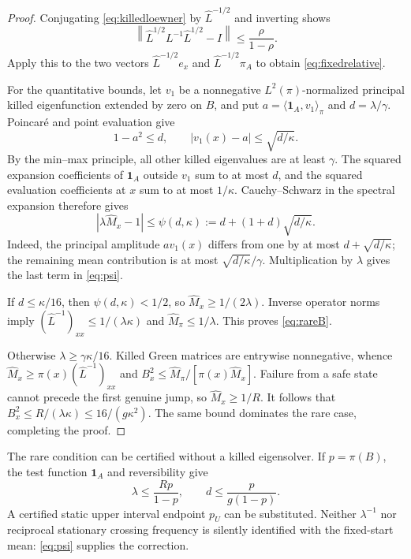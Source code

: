 \documentclass[10pt,a4paper]{article}
\theoremstyle{definition}\newtheorem{assumption}[theorem]{Assumption}
\newcommand{\one}{\mathbf 1}
\newcommand{\ip}[2]{\langle #1,#2\rangle_\pi}
\begin{document}
\begin{proof}
Conjugating \eqref{eq:killedloewner} by $\widehat L^{-1/2}$ and inverting shows
\[
 \left\|\widehat L^{1/2}L^{-1}\widehat L^{1/2}-I\right\|
 \le\frac{\rho}{1-\rho}.
\]
Apply this to the two vectors $\widehat L^{-1/2}e_x$ and $\widehat L^{-1/2}\pi_A$ to obtain \eqref{eq:fixedrelative}.

For the quantitative bounds, let $v_1$ be a nonnegative $L^2(\pi)$-normalized principal killed eigenfunction extended by zero on $B$, and put $a=\ip{\one_A}{v_1}$ and $d=\lambda/\gamma$. Poincar\'e and point evaluation give
\[
 1-a^2\le d,\qquad |v_1(x)-a|\le\sqrt{d/\kappa}.
\]
By the min--max principle, all other killed eigenvalues are at least $\gamma$. The squared expansion coefficients of $\one_A$ outside $v_1$ sum to at most $d$, and the squared evaluation coefficients at $x$ sum to at most $1/\kappa$. Cauchy--Schwarz in the spectral expansion therefore gives
\begin{equation}
 \left|\lambda\widehat M_x-1\right|
 \le \psi(d,\kappa):=d+(1+d)\sqrt{d/\kappa}.
 \label{eq:psi}
\end{equation}
Indeed, the principal amplitude $av_1(x)$ differs from one by at most $d+\sqrt{d/\kappa}$; the remaining mean contribution is at most $\sqrt{d/\kappa}/\gamma$. Multiplication by $\lambda$ gives the last term in \eqref{eq:psi}.

If $d\le\kappa/16$, then $\psi(d,\kappa)<1/2$, so $\widehat M_x\ge1/(2\lambda)$. Inverse operator norms imply
$(\widehat L^{-1})_{xx}\le1/(\lambda\kappa)$ and $\widehat M_\pi\le1/\lambda$. This proves \eqref{eq:rareB}.

Otherwise $\lambda\ge\gamma\kappa/16$. Killed Green matrices are entrywise nonnegative, whence
$\widehat M_x\ge\pi(x)(\widehat L^{-1})_{xx}$ and
$B_x^2\le\widehat M_\pi/[\pi(x)\widehat M_x]$.
Failure from a safe state cannot precede the first genuine jump, so $\widehat M_x\ge1/R$. It follows that
$B_x^2\le R/(\lambda\kappa)\le16/(g\kappa^2)$.
The same bound dominates the rare case, completing the proof.
\end{proof}

The rare condition can be certified without a killed eigensolver. If $p=\pi(B)$, the test function $\one_A$ and reversibility give
\begin{equation}
 \lambda\le \frac{Rp}{1-p},\qquad
 d\le \frac{p}{g(1-p)}.
 \label{eq:rarecheck}
\end{equation}
A certified static upper interval endpoint $p_U$ can be substituted. Neither $\lambda^{-1}$ nor reciprocal stationary crossing frequency is silently identified with the fixed-start mean: \eqref{eq:psi} supplies the correction.
\end{document}
